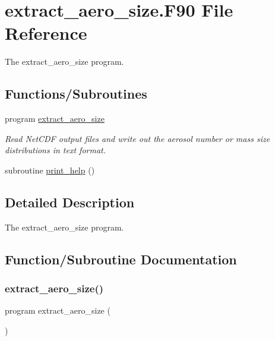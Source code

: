 \hypertarget{extract__aero__size_8_f90}{}\section{extract\+\_\+aero\+\_\+size.\+F90 File Reference}
\label{extract__aero__size_8_f90}


The extract\+\_\+aero\+\_\+size program.  


\subsection*{Functions/\+Subroutines}
\begin{DoxyCompactItemize}
\item 
program \mbox{\hyperlink{extract__aero__size_8_f90_a8d3d882891336f6038b9a78037de841d}{extract\+\_\+aero\+\_\+size}}
\begin{DoxyCompactList}\small\item\em Read Net\+C\+DF output files and write out the aerosol number or mass size distributions in text format. \end{DoxyCompactList}\item 
subroutine \mbox{\hyperlink{extract__aero__size_8_f90_a81d35e7230d75e333829a2fb36cbafc0}{print\+\_\+help}} ()
\end{DoxyCompactItemize}


\subsection{Detailed Description}
The extract\+\_\+aero\+\_\+size program. 



\subsection{Function/\+Subroutine Documentation}
\mbox{\label{extract__aero__size_8_f90_a8d3d882891336f6038b9a78037de841d}} 
\subsubsection{\texorpdfstring{extract\+\_\+aero\+\_\+size()}{extract\_aero\_size()}}
{\footnotesize\ttfamily program extract\+\_\+aero\+\_\+size (\begin{DoxyParamCaption}{ }\end{DoxyParamCaption})}



